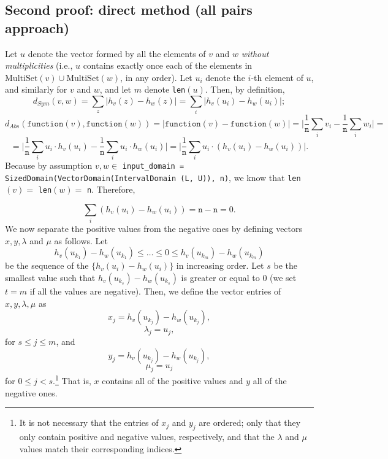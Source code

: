 \documentclass[11pt,a4paper]{article}
\theoremstyle{definition}
\newcommand{\MultiSet}{\mathrm{MultiSet}}
\newcommand{\function}{\texttt{function}}
\begin{document}
\subsection{Second proof: direct method (all pairs approach)}
Let $u$ denote the vector formed by all the elements of $v$ and $w$ \textit{without multiplicities} (i.e., $u$ contains exactly once each of the elements in $\MultiSet(v) \cup \MultiSet(w)$, in any order). Let $u_i$ denote the $i$-th element of $u$, and similarly for $v$ and $w$, and let $m$ denote \texttt{len}$(u)$.  
Then, by definition,
\[
    d_{Sym}(v, w) = \sum_z \Big|h_v(z) - h_w(z)\Big| = \sum_i \Big|h_v(u_i) - h_w(u_i)\Big|;
\]
\[
    d_{Abs}(\function(v), \function(w)) = \Big|\function(v) - \function(w)\Big| = \Big|\dfrac{1}{\texttt{n}}\sum_i v_i - \dfrac{1}{\texttt{n}}\sum_i w_i\Big| = 
\]
\[
   = \Big|\dfrac{1}{\texttt{n}}\sum_i u_i \cdot h_v(u_i) - \dfrac{1}{\texttt{n}}\sum_i u_i \cdot h_w(u_i)\Big| = \Big|\dfrac{1}{\texttt{n}}\sum_i u_i \cdot (h_v(u_i) - h_w(u_i))\Big|.
\]
Because by assumption $v, w \in $ \texttt{input\_domain = SizedDomain(VectorDomain(IntervalDomain (L, U)), n)}, we know that \texttt{len}$(v) =$ \texttt{len}$(w) =$ \texttt{n}. Therefore,

\begin{equation}\label{eq:sum}
    \sum_i (h_v(u_i) - h_w(u_i)) = \texttt{n}-\texttt{n} = 0.
\end{equation}
We now separate the positive values from the negative ones by defining vectors $x, y, \lambda$ and $\mu$ as follows. Let
\[
    h_v(u_{k_1})-h_w(u_{k_1}) \leq \ldots \leq 0 \leq h_v(u_{k_m})-h_w(u_{k_m}) 
\]
be the sequence of the $\{h_v(u_i)-h_w(u_{i})\}$ in increasing order. Let $s$ be the smallest value such that $h_v(u_{k_s})-h_w(u_{k_s})$ is greater or equal to 0 (we set $t=m$ if all the values are negative). Then, we define the vector entries of $x, y, \lambda, \mu$ as
\[
    x_j = h_v(u_{k_{j}})-h_w(u_{k_{j}}),
\]
\[
    \lambda_j = u_{j},
\]
for $s \leq j \leq m$, and
\[
    y_j = h_v(u_{k_{j}})-h_w(u_{k_{j}}),
\]
\[
    \mu_j = u_j
\]
for $0 \leq j < s$.\footnote{It is not necessary that the entries of $x_j$ and $y_j$ are ordered; only that they only contain positive and negative values, respectively, and that the $\lambda$ and $\mu$ values match their corresponding indices.} That is, $x$ contains all of the positive values and $y$ all of the negative ones.
\end{document}
